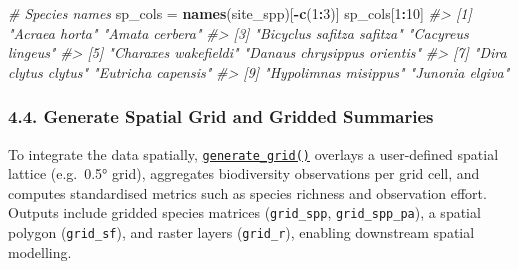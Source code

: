 \documentclass[
]{article}
\newenvironment{Shaded}{\begin{snugshade}}{\end{snugshade}}
\newcommand{\CommentTok}[1]{\textcolor[rgb]{0.56,0.35,0.01}{\textit{#1}}}
\newcommand{\DecValTok}[1]{\textcolor[rgb]{0.00,0.00,0.81}{#1}}
\newcommand{\FunctionTok}[1]{\textcolor[rgb]{0.13,0.29,0.53}{\textbf{#1}}}
\newcommand{\NormalTok}[1]{#1}
\newcommand{\OtherTok}[1]{\textcolor[rgb]{0.56,0.35,0.01}{#1}}
\newcommand{\SpecialCharTok}[1]{\textcolor[rgb]{0.81,0.36,0.00}{\textbf{#1}}}
\begin{document}
\begin{Shaded}
\begin{Highlighting}[]
\CommentTok{\# Species names}
\NormalTok{sp\_cols }\OtherTok{=} \FunctionTok{names}\NormalTok{(site\_spp)[}\SpecialCharTok{{-}}\FunctionTok{c}\NormalTok{(}\DecValTok{1}\SpecialCharTok{:}\DecValTok{3}\NormalTok{)]}
\NormalTok{sp\_cols[}\DecValTok{1}\SpecialCharTok{:}\DecValTok{10}\NormalTok{]}
\CommentTok{\#\textgreater{}  [1] "Acraea horta"               "Amata cerbera"             }
\CommentTok{\#\textgreater{}  [3] "Bicyclus safitza safitza"   "Cacyreus lingeus"          }
\CommentTok{\#\textgreater{}  [5] "Charaxes wakefieldi"        "Danaus chrysippus orientis"}
\CommentTok{\#\textgreater{}  [7] "Dira clytus clytus"         "Eutricha capensis"         }
\CommentTok{\#\textgreater{}  [9] "Hypolimnas misippus"        "Junonia elgiva"}
\end{Highlighting}
\end{Shaded}

\hypertarget{generate-spatial-grid-and-gridded-summaries}{%
\subsubsection{4.4. Generate Spatial Grid and Gridded
Summaries}\label{generate-spatial-grid-and-gridded-summaries}}

To integrate the data spatially,
\href{https://macsands.github.io/dissmapr/reference/generate_grid.html}{\texttt{generate\_grid()}}
overlays a user-defined spatial lattice (e.g.~0.5° grid), aggregates
biodiversity observations per grid cell, and computes standardised
metrics such as species richness and observation effort. Outputs include
gridded species matrices (\texttt{grid\_spp}, \texttt{grid\_spp\_pa}), a
spatial polygon (\texttt{grid\_sf}), and raster layers
(\texttt{grid\_r}), enabling downstream spatial modelling.
\end{document}
